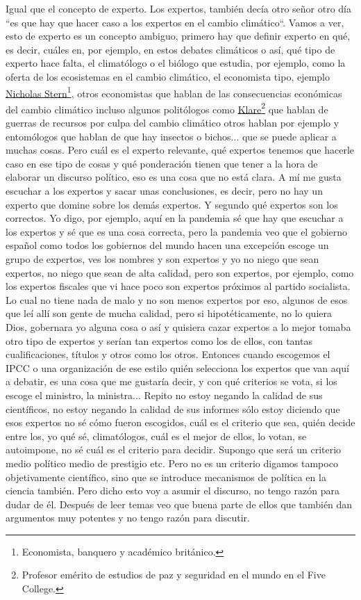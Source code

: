 Igual que el concepto de experto. Los expertos, también decía otro señor otro día ``es que hay que hacer caso a los expertos en el cambio climático``. Vamos a ver, esto de experto es un concepto ambiguo, primero hay que definir experto en qué, es decir, cuáles en, por ejemplo, en estos debates climáticos o así, qué tipo de experto hace falta, el climatólogo o el biólogo que estudia, por ejemplo, como la oferta de los ecosistemas en el cambio climático, el economista tipo, ejemplo \href{https://en.wikipedia.org/wiki/Nicholas_Stern%2C_Baron_Stern_of_Brentford}{Nicholas Stern}\footnote{Economista, banquero y académico británico.}, otros economistas que hablan de las consecuencias económicas del cambio climático incluso algunos politólogos como \href{https://en.wikipedia.org/wiki/Michael_Klare}{Klare}\footnote{Profesor emérito de estudios de paz y seguridad en el mundo en el Five College.} que hablan de guerras de recursos por culpa del cambio climático otros hablan por ejemplo y entomólogos que hablan de que hay insectos o bichos... que se puede aplicar a muchas cosas. Pero cuál es el experto relevante, qué expertos tenemos que hacerle caso en ese tipo de cosas y qué ponderación tienen que tener a la hora de elaborar un discurso político, eso es una cosa que no está clara. A mí me gusta escuchar a los expertos y sacar unas conclusiones, es decir, pero no hay un experto que domine sobre los demás expertos. Y segundo qué expertos son los correctos. Yo digo, por ejemplo, aquí en la pandemia sé que hay que escuchar a los expertos y sé que es una cosa correcta, pero la pandemia veo que el gobierno español como todos los gobiernos del mundo hacen una excepción escoge un grupo de expertos, ves los nombres y son expertos y yo no niego que sean expertos, no niego que sean de alta calidad, pero son expertos, por ejemplo, como los expertos fiscales que vi hace poco son expertos próximos al partido socialista. Lo cual no tiene nada de malo y no son menos expertos por eso, algunos de esos que leí allí son gente de mucha calidad, pero si hipotéticamente, no lo quiera Dios, gobernara yo alguna cosa o así y quisiera cazar expertos a lo mejor tomaba otro tipo de expertos y serían tan expertos como los de ellos, con tantas cualificaciones, títulos y otros como los otros. Entonces cuando escogemos el IPCC o una organización de ese estilo quién selecciona los expertos que van aquí a debatir, es una cosa que me gustaría decir, y con qué criterios se vota, si los escoge el ministro, la ministra... Repito no estoy negando la calidad de sus científicos, no estoy negando la calidad de sus informes sólo estoy diciendo que esos expertos no sé cómo fueron escogidos, cuál es el criterio que sea, quién decide entre los, yo qué sé, climatólogos, cuál es el mejor de ellos, lo votan, se autoimpone, no sé cuál es el criterio para decidir. Supongo que será un criterio medio político medio de prestigio etc. Pero no es un criterio digamos tampoco objetivamente científico, sino que se introduce mecanismos de política en la ciencia también. Pero dicho esto voy a asumir el discurso, no tengo razón para dudar de él. Después de leer temas veo que buena parte de ellos que también dan argumentos muy potentes y no tengo razón para discutir.


